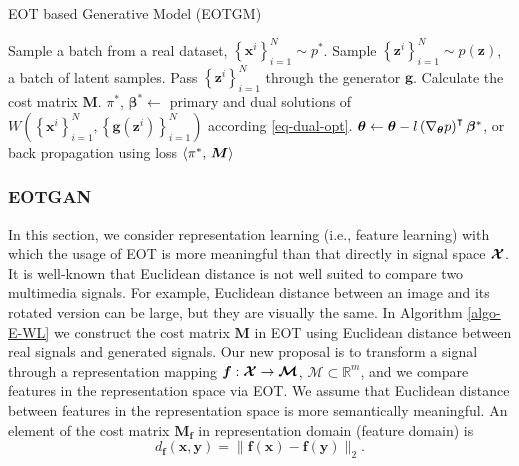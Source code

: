 \begin{algorithm}[!tp]
  \caption{EOT based Generative Model (EOTGM)}\label{algo-E-WL}
  \begin{algorithmic}[1]
    \STATE Sample  a batch from a real dataset, $\left\{ \bm{x}^{i} \right\}_{i=1}^{N} \sim p^{\ast}$. 
    \STATE Sample $\left\{ \bm{z}^{i} \right\}_{i=1}^{N} \sim p(\bm{z})$, a batch of latent samples.
    \STATE Pass $\left\{ \bm{z}^{i} \right\}_{i=1}^{N}$ through the generator $\bm{g}$.
    \STATE Calculate the cost matrix $\bm{M}$.
    \STATE $\pi^{\ast}$, $\bm{\beta}^{\ast} \gets$ primary and dual
    solutions of $W(\left\{ \bm{x}^{i} \right\}_{i=1}^{N}, \left\{
      \bm{g}(\bm{z}^{i})\right\}_{i=1}^{N})$ according \eqref{eq-dual-opt}.
    \STATE $\bm{\theta} \gets \bm{\theta} - l \left(\nabla_{\bm{\theta}}{p}\right)^{\intercal}
    \bm{\beta}^{\ast}$, or back propagation using loss $\langle \pi^{\ast},\,\bm{M}\rangle$
    \ENDWHILE
  \end{algorithmic}
\end{algorithm}

\subsubsection{EOTGAN}

In this section, we consider representation learning (i.e., feature
learning) with which the usage of EOT is more meaningful than that
directly in signal space $\bm{\mathcal{X}}$.
It is well-known that Euclidean distance is not well suited to compare
two multimedia signals. For example, Euclidean distance between an
image and its rotated version can be large, but they are visually the same. In Algorithm \ref{algo-E-WL} we construct the cost matrix $\bm{M}$ in EOT using 
Euclidean distance between real signals and generated signals. Our new proposal is to transform a signal through a representation mapping 
$\bm{f}: \bm{\mathcal{X}} \rightarrow \bm{\mathcal{M}}$, $\bm{\mathcal{M}}\subset\mathbb{R}^{m}$, and we compare features in the representation space via EOT. We assume that Euclidean distance
between features in the representation space is more semantically
meaningful. An element of the cost matrix $\bm{M_f}$ in representation domain (feature domain) is
\begin{equation}\label{def-similarity}
  d_{\bm{f}}(\bm{x}, \bm{y}) = \|\bm{f}(\bm{x})-\bm{f}(\bm{y})\|_{2}.
\end{equation}


